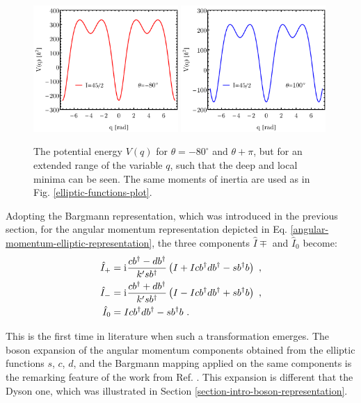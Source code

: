 \begin{figure}
    \centering
    \includegraphics[width=0.49\textwidth]{Chapters/Figures/Elliptic-Potential-deep-1.pdf}
    \includegraphics[width=0.49\textwidth]{Chapters/Figures/Elliptic-Potential-deep-1-180.pdf}
    \caption{The potential energy $V(q)$ for $\theta=-80^\circ$ and $\theta+\pi$, but for an extended range of the variable $q$, such that the deep and local minima can be seen. The same moments of inertia are used as in Fig. \ref{elliptic-functions-plot}.}
\end{figure}

Adopting the Bargmann representation, which was introduced in the previous section, for the angular momentum representation depicted in Eq. \ref{angular-momentum-elliptic-representation}, the three components $\hat{I}\mp$ and $\hat{I}_0$ become:
\begin{align}
    \hat{I}_+&=\mathrm{i}\mkern1mu\frac{cb^\dagger-db^\dagger}{k'sb^\dagger}\left(I+Icb^\dagger db^\dagger-sb^\dagger b\right)\ ,\nonumber\\
    \hat{I}_-&=\mathrm{i}\mkern1mu\frac{cb^\dagger+db^\dagger}{k'sb^\dagger}\left(I-Icb^\dagger d b^\dagger+sb^\dagger b\right)\ ,\nonumber\\
    \hat{I}_0&=Icb^\dagger db^\dagger-sb^\dagger b\ .
    \label{angular-momentum-elliptic-bargmann}
\end{align}

This is the first time in literature when such a transformation emerges. The boson expansion of the angular momentum components obtained from the elliptic functions $s$, $c$, $d$, and the Bargmann mapping applied on the same components is the remarking feature of the work from Ref. \cite{raduta2020new}. This expansion is different that the Dyson one, which was illustrated in Section \ref{section-intro-boson-representation}.

